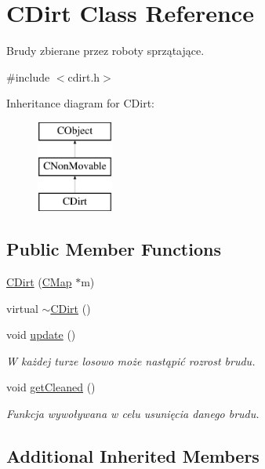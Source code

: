 \hypertarget{class_c_dirt}{}\section{C\+Dirt Class Reference}
\label{class_c_dirt}


Brudy zbierane przez roboty sprzątające.  




{\ttfamily \#include $<$cdirt.\+h$>$}

Inheritance diagram for C\+Dirt\+:\begin{figure}[H]
\begin{center}
\leavevmode
\includegraphics[height=3.000000cm]{class_c_dirt}
\end{center}
\end{figure}
\subsection*{Public Member Functions}
\begin{DoxyCompactItemize}
\item 
\mbox{\hyperlink{class_c_dirt_ac6f6303193035707f229f8569edfdcfc}{C\+Dirt}} (\mbox{\hyperlink{class_c_map}{C\+Map}} $\ast$m)
\item 
virtual \mbox{\hyperlink{class_c_dirt_a1cd1a70d7c690518f7dbd1a93e6d3da4}{$\sim$\+C\+Dirt}} ()
\item 
void \mbox{\hyperlink{class_c_dirt_a0f077e7fde1b397f08659f65d28cf573}{update}} ()
\begin{DoxyCompactList}\small\item\em W każdej turze losowo może nastąpić rozrost brudu. \end{DoxyCompactList}\item 
void \mbox{\hyperlink{class_c_dirt_a20be69acaff474646f86b128c0fd65f0}{get\+Cleaned}} ()
\begin{DoxyCompactList}\small\item\em Funkcja wywoływana w celu usunięcia danego brudu. \end{DoxyCompactList}\end{DoxyCompactItemize}
\subsection*{Additional Inherited Members}


